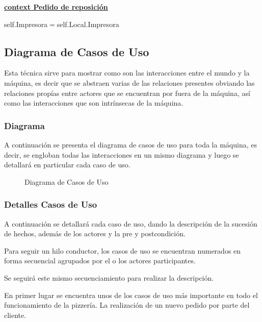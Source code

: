 \documentclass[a4paper,10pt]{article}
\begin{document}
\medskip

\underline{\textbf{context Pedido de reposición}}

self.Impresora$=$self.Local.Impresora

\newpage

\subsection*{Diagrama de Casos de Uso}

Esta t\'ecnica sirve para mostrar como son las interacciones entre el mundo y la m\'aquina, es decir que se abstraen varias de las relaciones presentes
obviando las relaciones prop\'ias entre actores que se encuentran por fuera de la m\'aquina, as\'i como las interacciones que son intr\'insecas de la m\'aquina.

\subsubsection*{Diagrama}

A continuaci\'on se presenta el diagrama de casos de uso para toda la m\'aquina, es decir, se engloban todas las interacciones en un mismo diagrama
y luego se detallar\'a en particular cada caso de uso.


\begin{figure}[H]
\centering
{}
\caption{Diagrama de Casos de Uso}
\end{figure}


\subsubsection*{Detalles Casos de Uso}

A continuaci\'on se detallar\'a cada caso de uso, dando la descripci\'on de la sucesi\'on de hechos, adem\'as de los actores y la pre y postcondici\'on.

Para seguir un hilo conductor, los casos de uso se encuentran numerados en forma secuencial agrupados por el o los actores participantes.

Se seguir\'a este mismo secuenciamiento para realizar la descripci\'on.

\bigskip


En primer lugar se encuentra unos de los casos de uso m\'as importante en todo el funcionamiento de la pizzer\'ia. La realizaci\'on de un nuevo
pedido por parte del cliente.
\end{document}
